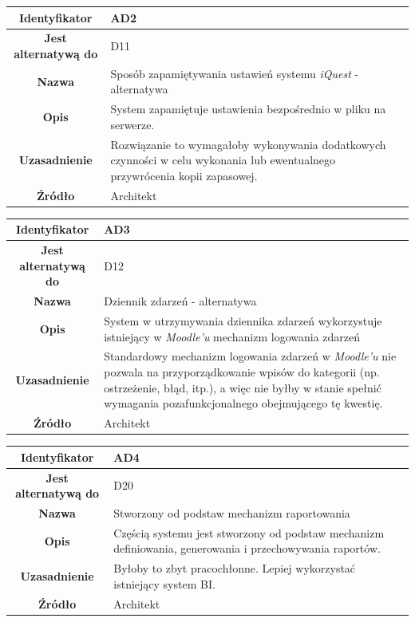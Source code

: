 \begin{table}[H]
\centering
\begin{tabular}{ | >{\bfseries}c | p{11cm} | }
\hline
%
Identyfikator & AD2 \\ \hline
Jest alternatywą do & D11 \\ \hline
Nazwa & Sposób zapamiętywania ustawień systemu \textit{iQuest} - alternatywa \\ \hline
Opis & System zapamiętuje ustawienia bezpośrednio w pliku na serwerze. \\ \hline
Uzasadnienie & Rozwiązanie to wymagałoby wykonywania dodatkowych czynności w celu wykonania lub ewentualnego przywrócenia kopii zapasowej. \\ \hline
Źródło & Architekt \\ \hline
%
\end{tabular}
\end{table}

\begin{table}[H]
\centering
\begin{tabular}{ | >{\bfseries}c | p{11cm} | }
\hline
%
Identyfikator & AD3 \\ \hline
Jest alternatywą do & D12 \\ \hline
Nazwa & Dziennik zdarzeń - alternatywa \\ \hline
Opis & System w utrzymywania dziennika zdarzeń wykorzystuje istniejący w \textit{Moodle'u} mechanizm logowania zdarzeń \\ \hline
Uzasadnienie & Standardowy mechanizm logowania zdarzeń w \textit{Moodle'u} nie pozwala na przyporządkowanie wpisów do kategorii (np. ostrzeżenie, błąd, itp.), a więc nie byłby w stanie spełnić wymagania pozafunkcjonalnego obejmującego tę kwestię. \\ \hline
Źródło & Architekt \\ \hline
%
\end{tabular}
\end{table}

\begin{table}[H]
\centering
\begin{tabular}{ | >{\bfseries}c | p{11cm} | }
\hline
%
Identyfikator & AD4 \\ \hline
Jest alternatywą do & D20 \\ \hline
Nazwa & Stworzony od podstaw mechanizm raportowania \\ \hline
Opis & Częścią systemu jest stworzony od podstaw mechanizm definiowania, generowania i przechowywania raportów. \\ \hline
Uzasadnienie &  	Byłoby to zbyt pracochłonne. Lepiej wykorzystać istniejący system BI. \\ \hline
Źródło & Architekt \\ \hline
%
\end{tabular}
\end{table}

